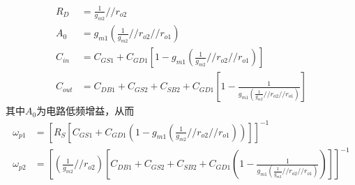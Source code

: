 \documentclass[hyperref, UTF8]{ctexart}
\newcommand{\under}[1]{\frac{1}{#1}}
\begin{document}
    \begin{align*}
        R_D & = \under{g_{m2}} // r_{o2} \\
        A_0 & = g_{m1}\left(\under{g_{m2}} // r_{o2} // r_{o1} \right) \\
        C_{in} & = C_{GS1}+C_{GD1}\left[1 - g_{m1}\left(\under{g_{m2}} // r_{o2} // r_{o1} \right)\right] \\
        C_{out} & = C_{DB1} + C_{GS2} + C_{SB2} + C_{GD1}\left[1 - \under{g_{m1}\left(\under{g_{m2}} // r_{o2} // r_{o1} \right)}\right]
    \end{align*}
    其中$A_0$为电路低频增益，从而
    \begin{align*}
        \omega_{p1} & = \left[ R_S
        \left[C_{GS1}+C_{GD1}\left(1 - g_{m1}\left(\under{g_{m2}} // r_{o2} // r_{o1} \right)\right) \right] \right] ^ {-1} \\
        \omega_{p2} & = \left[ 
            \left( \under{g_{m2}}//r_{o2}\right) 
            \left[ C_{DB1} + C_{GS2} + C_{SB2} + C_{GD1}\left(1 - \under{g_{m1}\left(\under{g_{m2}} // r_{o2} // r_{o1} \right)}\right) \right] 
            \right] ^ {-1}
    \end{align*}
\end{document}
